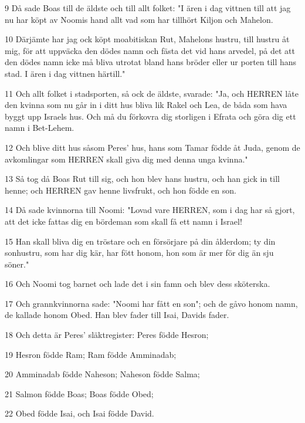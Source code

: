 \par 9 Då sade Boas till de äldste och till allt folket: "I ären i dag vittnen till att jag nu har köpt av Noomis hand allt vad som har tillhört Kiljon och Mahelon.
\par 10 Därjämte har jag ock köpt moabitiskan Rut, Mahelons hustru, till hustru åt mig, för att uppväcka den dödes namn och fästa det vid hans arvedel, på det att den dödes namn icke må bliva utrotat bland hans bröder eller ur porten till hans stad. I ären i dag vittnen härtill."
\par 11 Och allt folket i stadsporten, så ock de äldste, svarade: "Ja, och HERREN låte den kvinna som nu går in i ditt hus bliva lik Rakel och Lea, de båda som hava byggt upp Israels hus. Och må du förkovra dig storligen i Efrata och göra dig ett namn i Bet-Lehem.
\par 12 Och blive ditt hus såsom Peres' hus, hans som Tamar födde åt Juda, genom de avkomlingar som HERREN skall giva dig med denna unga kvinna."
\par 13 Så tog då Boas Rut till sig, och hon blev hans hustru, och han gick in till henne; och HERREN gav henne livsfrukt, och hon födde en son.
\par 14 Då sade kvinnorna till Noomi: "Lovad vare HERREN, som i dag har så gjort, att det icke fattas dig en bördeman som skall få ett namn i Israel!
\par 15 Han skall bliva dig en tröstare och en försörjare på din ålderdom; ty din sonhustru, som har dig kär, har fött honom, hon som är mer för dig än sju söner."
\par 16 Och Noomi tog barnet och lade det i sin famn och blev dess sköterska.
\par 17 Och grannkvinnorna sade: "Noomi har fått en son"; och de gåvo honom namn, de kallade honom Obed. Han blev fader till Isai, Davids fader.
\par 18 Och detta är Peres' släktregister: Peres födde Hesron;
\par 19 Hesron födde Ram; Ram födde Amminadab;
\par 20 Amminadab födde Naheson; Naheson födde Salma;
\par 21 Salmon födde Boas; Boas födde Obed;
\par 22 Obed födde Isai, och Isai födde David.


